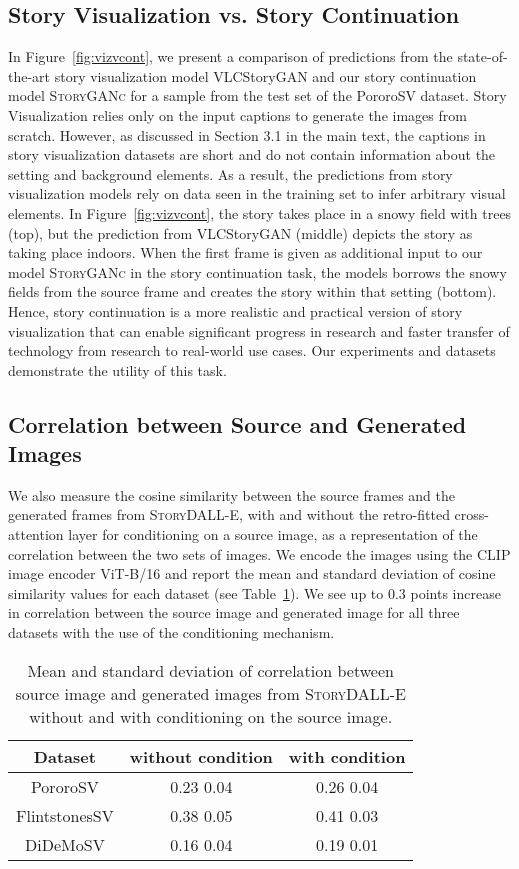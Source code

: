 \documentclass[runningheads]{llncs}
\newcommand{\sdalle}[1]{\textsc{StoryDALL-E}}
\newcommand{\sgan}[1]{\textsc{StoryGANc}}
\begin{document}
\subsection{Story Visualization vs. Story Continuation}
In Figure~\ref{fig:vizvcont}, we present a comparison of predictions from the state-of-the-art story visualization model VLCStoryGAN \cite{maharana2021integrating} and our story continuation model \sgan{} for a sample from the test set of the PororoSV dataset. Story Visualization relies only on the input captions to generate the images from scratch. However, as discussed in Section 3.1 in the main text, the captions in story visualization datasets are short and do not contain information about the setting and background elements. As a result, the predictions from story visualization models rely on data seen in the training set to infer arbitrary visual elements. In Figure~\ref{fig:vizvcont}, the story takes place in a snowy field with trees (top), but the prediction from VLCStoryGAN (middle) depicts the story as taking place indoors. When the first frame is given as additional input to our model \sgan{} in the story continuation task, the models borrows the snowy fields from the source frame and creates the story within that setting (bottom). Hence, story continuation is a more realistic and practical version of story visualization that can enable significant progress in research and faster transfer of technology from research to real-world use cases. Our experiments and datasets demonstrate the utility of this task.

\subsection{Correlation between Source and Generated Images}

We also measure the cosine similarity between the source frames and the generated frames from \sdalle{}, with and without the retro-fitted cross-attention layer for conditioning on a source image, as a representation of the correlation between the two sets of images. We encode the images using the CLIP image encoder ViT-B/16 and report the mean and standard deviation of cosine similarity values for each dataset (see Table~\ref{tab:correlation}). We see up to 0.3 points increase in correlation between the source image and generated image for all three datasets with the use of the conditioning mechanism.

\begin{table}[h]
\centering
\caption{\label{tab:correlation} Mean and standard deviation of correlation between source image and generated images from \sdalle{} without and with conditioning on the source image.}
\begin{tabular}{ |c|c|c| } 
\hline
\textbf{Dataset} & \textbf{without condition} & \textbf{with condition}\\ 
\hline
PororoSV & 0.23  0.04 & 0.26  0.04 \\
FlintstonesSV  & 0.38  0.05 & 0.41  0.03\\
DiDeMoSV & 0.16  0.04 & 0.19  0.01\\
\hline
\end{tabular}
\end{table}
\end{document}
